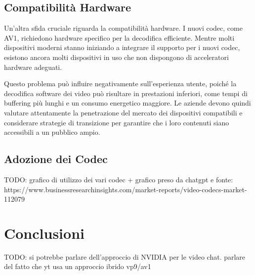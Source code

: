 \documentclass[a4paper,12pt, oneside]{article}
\begin{document}
\subsection{Compatibilità Hardware}
Un'altra sfida cruciale riguarda la compatibilità hardware. I nuovi codec, come AV1, richiedono
hardware specifico per la decodifica efficiente. Mentre molti dispositivi moderni stanno iniziando a
integrare il supporto per i nuovi codec, esistono ancora molti dispositivi in uso che non dispongono
di acceleratori hardware adeguati.

Questo problema può influire negativamente sull'esperienza utente, poiché la decodifica software dei
video può risultare in prestazioni inferiori, come tempi di buffering più lunghi e un consumo energetico
maggiore. Le aziende devono quindi valutare attentamente la penetrazione del mercato dei dispositivi
compatibili e considerare strategie di transizione per garantire che i loro contenuti siano accessibili
a un pubblico ampio.

\subsection{Adozione dei Codec}
TODO: grafico di utilizzo dei vari codec + grafico preso da chatgpt e fonte: https://www.businessresearchinsights.com/market-reports/video-codecs-market-112079

\section{Conclusioni}
TODO: si potrebbe parlare dell'approccio di NVIDIA per le video chat.
parlare del fatto che yt usa un approccio ibrido vp9/av1
\end{document}
